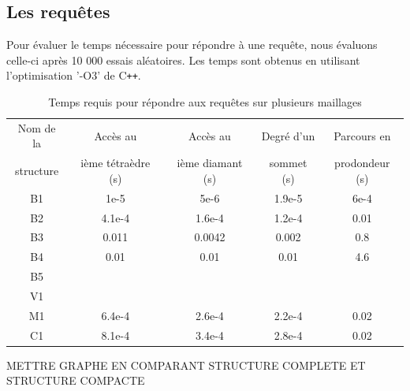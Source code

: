 \subsection{Les requêtes}
\noindent
Pour évaluer le temps nécessaire pour répondre à une requête, nous évaluons celle-ci après 10 000 essais aléatoires. Les temps sont obtenus en utilisant l'optimisation '-O3' de C\texttt{++}.
\begin{table}[h]
\footnotesize
\centering
\begin{tabular}{| c | c | c| c |c |}
\hline
Nom de la & Accès au& Accès au & Degré d'un & Parcours en\\
structure &ième tétraèdre (s)& ième diamant (s) &sommet (s)&prodondeur (s)\\
\hline
B1  & 1e-5 & 5e-6 & 1.9e-5 & 6e-4\\
B2  &  4.1e-4 & 1.6e-4 & 1.2e-4 & 0.01\\
B3 & 0.011 & 0.0042 & 0.002 & 0.8\\
B4 & 0.01 & 0.01 & 0.01 & 4.6\\
B5 & & & & \\
V1 & & & & \\
M1  & 6.4e-4 & 2.6e-4 & 2.2e-4 & 0.02\\
C1  & 8.1e-4 & 3.4e-4 & 2.8e-4 & 0.02\\
\hline  
\end{tabular}
\label{table:results_time}
\caption{Temps requis pour répondre aux requêtes sur plusieurs maillages}
\end{table}
\noindent


METTRE GRAPHE EN COMPARANT STRUCTURE COMPLETE ET STRUCTURE COMPACTE